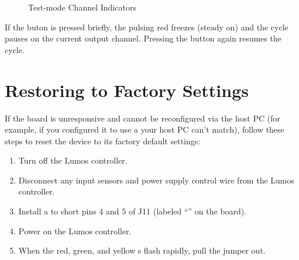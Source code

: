 \documentclass[letterpaper,twoside,onecolumn,openright,final]{memoir}
\begin{document}
\begin{figure}
\begin{center}
  \end{center}
  \caption{Test-mode Channel Indicators\label{fig:testbin}}
\end{figure}

If the  buton is pressed briefly, the pulsing red  freezes (steady on) and the cycle
pauses on the current output channel.  Pressing the  button again resumes the cycle.
      
\section{Restoring to Factory Settings}\label{ss:factoryreset}
If the board is unresponsive and cannot be reconfigured via the host PC (for example, if you configured
it to use a  your host PC can't match), follow these steps to reset the device to its 
factory default settings:
\begin{enumerate}
	\item	Turn off the Lumos controller.
	\item	Disconnect any input sensors and power supply control wire from the Lumos
		controller.
	\item	Install a  to short pins 4 and 5 of J11 (labeled ``''
		on the board).
	\item	Power on the Lumos controller.
	\item	When the red, green, and yellow s flash rapidly, pull the
		jumper out.
\end{enumerate}
\end{document}
